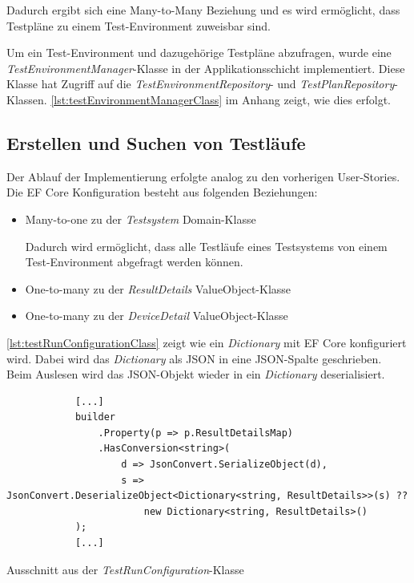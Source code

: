 \documentclass[a4paper, fontsize=11pt, parskip=half, twoside, headings=openright]{scrreprt}
\begin{document}
	Dadurch ergibt sich eine Many-to-Many Beziehung und es wird ermöglicht, dass Testpläne zu einem Test-Environment zuweisbar sind.
	
	Um ein Test-Environment und dazugehörige Testpläne abzufragen, wurde eine \emph{TestEnvironmentManager}-Klasse in der Applikationsschicht implementiert.
	Diese Klasse hat Zugriff auf die \emph{TestEnvironmentRepository}- und \emph{TestPlanRepository}-Klassen.
	\autoref{lst:testEnvironmentManagerClass} im Anhang zeigt, wie dies erfolgt.
	
	\subsection{Erstellen und Suchen von Testläufe} \label{subsec:createAndSearchTestruns}
	
	Der Ablauf der Implementierung erfolgte analog zu den vorherigen User-Stories.
	Die \ac{EF} Core Konfiguration besteht aus folgenden Beziehungen:
	
	\begin{itemize}
		\item Many-to-one zu der \emph{Testsystem} Domain-Klasse
		
		Dadurch wird ermöglicht, dass alle Testläufe eines Testsystems von einem Test-Environment abgefragt werden können.
		
		\item One-to-many zu der \emph{ResultDetails} ValueObject-Klasse
		\item One-to-many zu der \emph{DeviceDetail} ValueObject-Klasse
	\end{itemize}
	
	\autoref{lst:testRunConfigurationClass} zeigt wie ein \emph{Dictionary} mit \ac{EF} Core konfiguriert wird.
	Dabei wird das \emph{Dictionary} als \ac{JSON} in eine \ac{JSON}-Spalte geschrieben.
	Beim Auslesen wird das \ac{JSON}-Objekt wieder in ein \emph{Dictionary} deserialisiert.
	
	\begin{listing}[ht]
		\begin{verbatim}
			[...]			
			builder
				.Property(p => p.ResultDetailsMap)
				.HasConversion<string>(
					d => JsonConvert.SerializeObject(d),
					s => JsonConvert.DeserializeObject<Dictionary<string, ResultDetails>>(s) ??
						new Dictionary<string, ResultDetails>()
			);				
			[...]
		\end{verbatim}
		\caption{Ausschnitt aus der \emph{TestRunConfiguration}-Klasse}
		\label{lst:testRunConfigurationClass}
	\end{listing}
	
\end{document}
